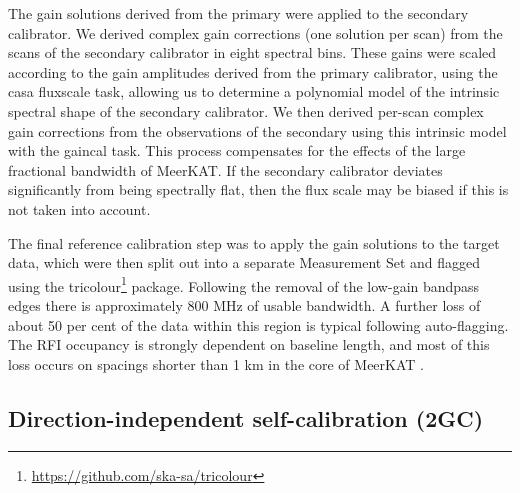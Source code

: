 \documentclass[usenatbib,usedcolumn]{mnras}
\begin{document}
The gain solutions derived from the primary were applied to the secondary calibrator. We derived complex gain corrections (one solution per scan) from the scans of the secondary calibrator in eight spectral bins. These gains were scaled according to the gain amplitudes derived from the primary calibrator, using the {\sc casa fluxscale} task, allowing us to determine a polynomial model of the intrinsic spectral shape of the secondary calibrator. We then derived per-scan complex gain corrections  from the observations of the secondary using this intrinsic model with the {\sc gaincal} task. This process compensates for the effects of the large fractional bandwidth of MeerKAT. If the secondary calibrator deviates significantly from being spectrally flat, then the flux scale may be biased if this is not taken into account.

The final reference calibration step was to apply the gain solutions to the target data, which were then split out into a separate Measurement Set and flagged using the {\sc tricolour}\footnote{\url{https://github.com/ska-sa/tricolour}} package. Following the removal of the low-gain bandpass edges there is approximately 800 MHz of usable bandwidth. A further loss of about 50 per cent of the data within this region is typical following auto-flagging. The RFI occupancy is strongly dependent on baseline length, and most of this loss occurs on spacings shorter than 1 km in the core of MeerKAT \citep[see also][]{mauch2020}.

\subsection{Direction-independent self-calibration (2GC)}
\label{sec:di_selfcal}
\end{document}
